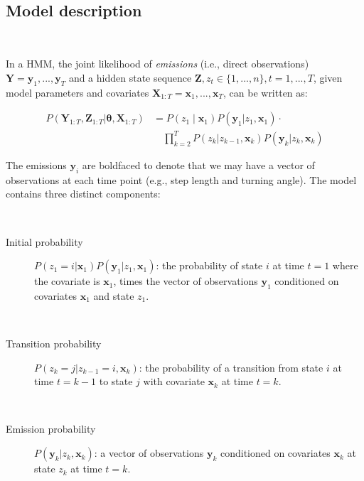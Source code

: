 \documentclass{bmcart}
\begin{document}
\

\subsection*{Model description}

\

\newcommand{\obs}{\mathbf{y}}
\newcommand{\cov}{\mathbf{x}}
\newcommand{\state}{z}

In a HMM, the joint likelihood of \emph{emissions} (i.e., direct observations) $ \mathbf Y = \obs_{1},..., \obs_{T}$ 
and a hidden state sequence $\mathbf{Z}, \state_{t} \in \{1,...,n\}, t=1,...,T$, given model
parameters \boldmath{$\theta$} and covariates $\mathbf{X}_{1:T} =\cov_{1},..., \cov_{T}$, can be written as:

\begin{equation}
\begin{split}
P(\mathbf{Y}_{1:T},\mathbf{Z}_{1:T}|\boldsymbol \theta,\mathbf{X}_{1:T}) & =
P(\state_{1} \mid \cov_{1})P(\obs_{1} | \state_{1}, \cov_{1}) \cdot \\
&  \quad \prod\limits_{k=2}^{T}P(\state_{k} | \state_{k-1}, \cov_{k})P(\obs_{k} | \state_{k},\cov_{k})
\end{split}
\label{eq:HMMlik}
\end{equation}


The emissions $\obs_i$ are boldfaced to denote that we may have a vector of observations at each time point (e.g., step length and turning angle).
The model contains three distinct components:

\

\begin{description}
\item[Initial probability] $P(\state_{1} = i | \cov_{1}) P(\obs_{1} | \state_{1}, \cov_{1} )$: the probability of state $i$ at time $t=1$ where the covariate is $\cov_{1}$, times the vector of observations $\obs_{1}$ conditioned on covariates $\cov_{1}$ and state $\state_{1}$.

\

\item[Transition probability] $P(\state_{k}=j | \state_{k-1}=i,\cov_{k})$: the probability of a transition from state $i$ at time $t=k-1$ to state $j$ with covariate $\cov_{k}$ at time $t=k$.

\

\item[Emission probability] $P(\obs_{k} | \state_{k},\cov_{k})$: a vector of observations $\obs_{k}$ conditioned on covariates $\cov_{k}$ at state $\state_{k}$ at time $t=k$.  
\end{description}
\end{document}
